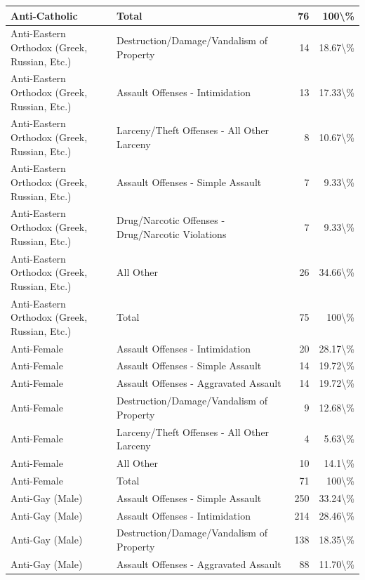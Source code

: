 \documentclass[
]{krantz}
\begin{document}
\begin{longtable}[t]{l|l|r|r}
\hline
Anti-Catholic & Total & 76 & 100\textbackslash{}\%\\
\hline
Anti-Eastern Orthodox (Greek, Russian, Etc.) & Destruction/Damage/Vandalism of Property & 14 & 18.67\textbackslash{}\%\\
\hline
Anti-Eastern Orthodox (Greek, Russian, Etc.) & Assault Offenses - Intimidation & 13 & 17.33\textbackslash{}\%\\
\hline
Anti-Eastern Orthodox (Greek, Russian, Etc.) & Larceny/Theft Offenses - All Other Larceny & 8 & 10.67\textbackslash{}\%\\
\hline
Anti-Eastern Orthodox (Greek, Russian, Etc.) & Assault Offenses - Simple Assault & 7 & 9.33\textbackslash{}\%\\
\hline
Anti-Eastern Orthodox (Greek, Russian, Etc.) & Drug/Narcotic Offenses - Drug/Narcotic Violations & 7 & 9.33\textbackslash{}\%\\
\hline
Anti-Eastern Orthodox (Greek, Russian, Etc.) & All Other & 26 & 34.66\textbackslash{}\%\\
\hline
Anti-Eastern Orthodox (Greek, Russian, Etc.) & Total & 75 & 100\textbackslash{}\%\\
\hline
Anti-Female & Assault Offenses - Intimidation & 20 & 28.17\textbackslash{}\%\\
\hline
Anti-Female & Assault Offenses - Simple Assault & 14 & 19.72\textbackslash{}\%\\
\hline
Anti-Female & Assault Offenses - Aggravated Assault & 14 & 19.72\textbackslash{}\%\\
\hline
Anti-Female & Destruction/Damage/Vandalism of Property & 9 & 12.68\textbackslash{}\%\\
\hline
Anti-Female & Larceny/Theft Offenses - All Other Larceny & 4 & 5.63\textbackslash{}\%\\
\hline
Anti-Female & All Other & 10 & 14.1\textbackslash{}\%\\
\hline
Anti-Female & Total & 71 & 100\textbackslash{}\%\\
\hline
Anti-Gay (Male) & Assault Offenses - Simple Assault & 250 & 33.24\textbackslash{}\%\\
\hline
Anti-Gay (Male) & Assault Offenses - Intimidation & 214 & 28.46\textbackslash{}\%\\
\hline
Anti-Gay (Male) & Destruction/Damage/Vandalism of Property & 138 & 18.35\textbackslash{}\%\\
\hline
Anti-Gay (Male) & Assault Offenses - Aggravated Assault & 88 & 11.70\textbackslash{}\%\\
\hline

\end{longtable}
\end{document}
